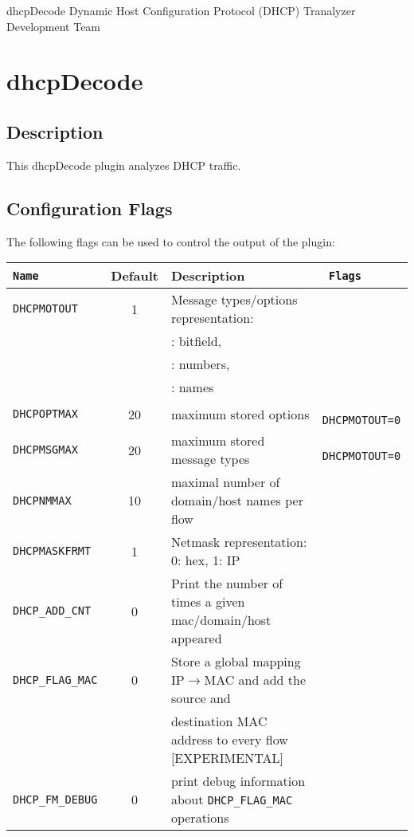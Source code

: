 \documentclass[documentation]{subfiles}
\begin{document}
\trantitle
    {dhcpDecode}
    {Dynamic Host Configuration Protocol (DHCP)}
    {Tranalyzer Development Team}

\section{dhcpDecode}\label{s:dhcpDecode}

\subsection{Description}
This dhcpDecode plugin analyzes DHCP traffic.


\subsection{Configuration Flags}
The following flags can be used to control the output of the plugin:
\begin{longtable}{>{\tt}lcl>{\tt\small}l}
    \toprule
    {\bf Name}      & {\bf Default} & {\bf Description}                                                & {\bf Flags}\\
    \midrule\endhead%
    DHCPMOTOUT      & 1             & Message types/options representation:                            & \\
                    &               & \qquad 0: bitfield,                                              & \\
                    &               & \qquad 1: numbers,                                               & \\
                    &               & \qquad 2: names                                                  & \\
    DHCPOPTMAX      & 20            & maximum stored options                                           & DHCPMOTOUT=0\\
    DHCPMSGMAX      & 20            & maximum stored message types                                     & DHCPMOTOUT=0\\
    DHCPNMMAX       & 10            & maximal number of domain/host names per flow                     & \\
    DHCPMASKFRMT    & 1             & Netmask representation: 0: hex, 1: IP                            & \\
    DHCP\_ADD\_CNT  & 0             & Print the number of times a given mac/domain/host appeared       & \\
    DHCP\_FLAG\_MAC & 0             & Store a global mapping IP$\rightarrow$MAC and add the source and & \\
                    &               & destination MAC address to every flow [EXPERIMENTAL]             & \\
    DHCP\_FM\_DEBUG & 0             & print debug information about {\tt DHCP\_FLAG\_MAC} operations   & \\
    \bottomrule
\end{longtable}
\end{document}
